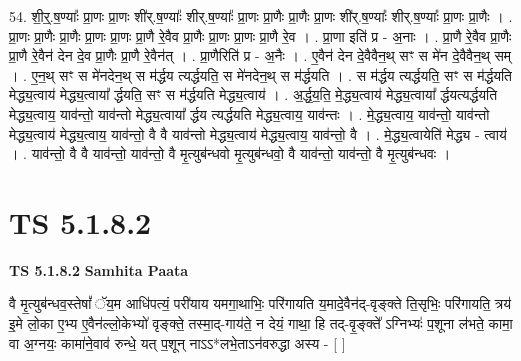 \documentclass[17pt]{extarticle}
\begin{document}
54. शी॒र्॒.ष॒ण्याः᳚ प्रा॒णः प्रा॒णः शी॑र्.ष॒ण्याः᳚ शीर्.ष॒ण्याः᳚ प्रा॒णः प्रा॒णैः प्रा॒णैः प्रा॒णः शी॑र्.ष॒ण्याः᳚ शीर्.ष॒ण्याः᳚ प्रा॒णः प्रा॒णैः । . प्रा॒णः प्रा॒णैः प्रा॒णैः प्रा॒णः प्रा॒णः प्रा॒णै रे॒वैव प्रा॒णैः प्रा॒णः प्रा॒णः प्रा॒णै रे॒व । . प्रा॒णा इति॑ प्र - अ॒नाः । . प्रा॒णै रे॒वैव प्रा॒णैः प्रा॒णै रे॒वैन॑ देन दे॒व प्रा॒णैः प्रा॒णै रे॒वैन॑त् । . प्रा॒णैरिति॑ प्र - अ॒नैः । . ए॒वैन॑ देन दे॒वैवैन॒थ् सꣳ स मे॑न दे॒वैवैन॒थ् सम् । . ए॒न॒थ् सꣳ स मे॑नदेन॒थ् स म॑र्द्धय त्यर्द्धयति॒ स मे॑नदेन॒थ् स म॑र्द्धयति । . स म॑र्द्धय त्यर्द्धयति॒ सꣳ स म॑र्द्धयति मेद्ध्य॒त्वाय॑ मेद्ध्य॒त्वाया᳚ र्द्धयति॒ सꣳ स म॑र्द्धयति मेद्ध्य॒त्वाय॑ । . अ॒र्द्ध॒य॒ति॒ मे॒द्ध्य॒त्वाय॑ मेद्ध्य॒त्वाया᳚ र्द्धयत्यर्द्धयति मेद्ध्य॒त्वाय॒ याव॑न्तो॒ याव॑न्तो मेद्ध्य॒त्वाया᳚ र्द्धय त्यर्द्धयति मेद्ध्य॒त्वाय॒ याव॑न्तः । . मे॒द्ध्य॒त्वाय॒ याव॑न्तो॒ याव॑न्तो मेद्ध्य॒त्वाय॑ मेद्ध्य॒त्वाय॒ याव॑न्तो॒ वै वै याव॑न्तो मेद्ध्य॒त्वाय॑ मेद्ध्य॒त्वाय॒ याव॑न्तो॒ वै । . मे॒द्ध्य॒त्वायेति॑ मेद्ध्य - त्वाय॑ । . याव॑न्तो॒ वै वै याव॑न्तो॒ याव॑न्तो॒ वै मृ॒त्युब॑न्धवो मृ॒त्युब॑न्धवो॒ वै याव॑न्तो॒ याव॑न्तो॒ वै मृ॒त्युब॑न्धवः । \newline
\pagebreak
{}

\section{ TS 5.1.8.2 }

\textbf{TS 5.1.8.2 } \newline
\textbf{Samhita Paata} \newline

वै मृ॒त्युब॑न्धव॒स्तेषां᳚ ॅय॒म आधि॑पत्यं॒ परी॑याय यमगा॒थाभिः॒ परि॑गायति य॒मादे॒वैन॑द्-वृङ्क्ते ति॒सृभिः॒ परि॑गायति॒ त्रय॑ इ॒मे लो॒का ए॒भ्य ए॒वैन॑ल्लो॒केभ्यो॑ वृङ्क्ते॒ तस्मा॒द्-गाय॑ते॒ न देयं॒ गाथा॒ हि तद्-वृ॒ङ्क्ते᳚ ऽग्निभ्यः॑ प॒शूना ल॑भते॒ कामा॒ वा अ॒ग्नयः॒ कामा॑ने॒वाव॑ रुन्धे॒ यत् प॒शून् नाऽऽ*लभे॒ताऽन॑वरुद्धा अस्य - [  ] \newline
\end{document}
